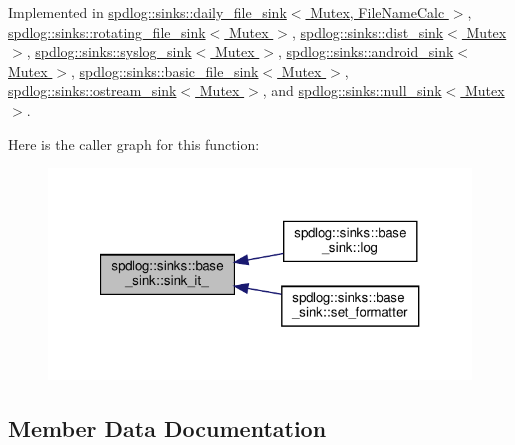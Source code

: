 Implemented in \hyperlink{classspdlog_1_1sinks_1_1daily__file__sink_ac82447cddb7a2ddb45ab81f97b74286d}{spdlog\+::sinks\+::daily\+\_\+file\+\_\+sink$<$ Mutex, File\+Name\+Calc $>$}, \hyperlink{classspdlog_1_1sinks_1_1rotating__file__sink_a3cf93e445ad92380c7d352f971cd76a4}{spdlog\+::sinks\+::rotating\+\_\+file\+\_\+sink$<$ Mutex $>$}, \hyperlink{classspdlog_1_1sinks_1_1dist__sink_a516ef929a8cd73df2ead2e0086e04607}{spdlog\+::sinks\+::dist\+\_\+sink$<$ Mutex $>$}, \hyperlink{classspdlog_1_1sinks_1_1syslog__sink_a303bccf40cd03356510391c493078005}{spdlog\+::sinks\+::syslog\+\_\+sink$<$ Mutex $>$}, \hyperlink{classspdlog_1_1sinks_1_1android__sink_ab91c7aabd013d009ff811e6d34324128}{spdlog\+::sinks\+::android\+\_\+sink$<$ Mutex $>$}, \hyperlink{classspdlog_1_1sinks_1_1basic__file__sink_a8d9239f225478ade4e879dc643f577ba}{spdlog\+::sinks\+::basic\+\_\+file\+\_\+sink$<$ Mutex $>$}, \hyperlink{classspdlog_1_1sinks_1_1ostream__sink_a77f36cef81daf668ec55a07fa191d1e7}{spdlog\+::sinks\+::ostream\+\_\+sink$<$ Mutex $>$}, and \hyperlink{classspdlog_1_1sinks_1_1null__sink_a158c702167f6a46609de2c561f82973c}{spdlog\+::sinks\+::null\+\_\+sink$<$ Mutex $>$}.

Here is the caller graph for this function\+:
\nopagebreak
\begin{figure}[H]
\begin{center}
\leavevmode
\includegraphics[width=321pt]{classspdlog_1_1sinks_1_1base__sink_ad698d300cb7f5e58b2aa1b9907cdbd87_icgraph}
\end{center}
\end{figure}


\subsection{Member Data Documentation}
\mbox{\label{classspdlog_1_1sinks_1_1base__sink_a929422554ce18d8bffd9b4d75cc7acf3}} 
